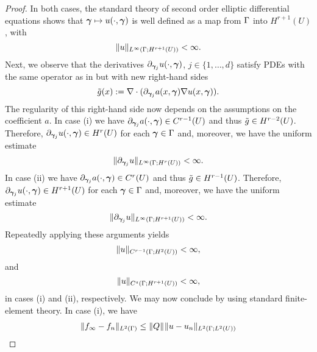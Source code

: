 \begin{proof}
	In both cases, the standard theory of second order elliptic differential equations shows that $\bm{\gamma}\mapsto u(\cdot,\bm{\gamma})$ is well defined as a map from $\Gamma$ into $H^{r+1}(U)$, with 
	\begin{equation*}
	\|u\|_{L^\infty(\Gamma;H^{r+1}(U))}<\infty.
	\end{equation*}
	Next, we observe that the derivatives $\partial_{\bm{\gamma}_{j}}u(\cdot,\bm{\gamma})$, $j\in \{1,\dots,d\}$ satisfy PDEs with the same operator as in  but with new right-hand sides
	\begin{equation*}
	\tilde{g}(x):=\nabla\cdot(\partial_{\bm{\gamma}_j}a(x,\bm{\gamma})\nabla u(x,\bm{\gamma})).
	\end{equation*}
	The regularity of this right-hand side now depends on the assumptions on the coefficient $a$.
	In case (i) we have $\partial_{\bm{\gamma}_j}a(\cdot,\bm{\gamma})\in C^{r-1}(U)$ and thus $\tilde{g}\in H^{r-2}(U)$. Therefore, $\partial_{\bm{\gamma}_{j}}u(\cdot,\bm{\gamma})\in H^{r}(U)$ for each $\bm{\gamma}\in\Gamma$ and, moreover, we have the uniform estimate
		\begin{equation*}
		\|\partial_{\bm{\gamma}_j}u\|_{L^\infty(\Gamma;H^{r}(U))}<\infty.
		\end{equation*}
		In case (ii) we have $\partial_{\bm{\gamma}_j}a(\cdot,\bm{\gamma})\in C^{r}(U)$ and thus $\tilde{g}\in H^{r-1}(U)$. Therefore, $\partial_{\bm{\gamma}_{j}}u(\cdot,\bm{\gamma})\in H^{r+1}(U)$ for each $\bm{\gamma}\in\Gamma$ and, moreover, we have the uniform estimate
		\begin{equation*}
		\|\partial_{\bm{\gamma}_j}u\|_{L^\infty(\Gamma;H^{r+1}(U))}<\infty.
		\end{equation*}
		Repeatedly applying these arguments yields
			\begin{equation*}
			\|u\|_{C^{r-1}(\Gamma;H^2(U))}<\infty,
			\end{equation*}
			and
			\begin{equation*}
			\|u\|_{C^{s}(\Gamma;H^{r+1}(U))}<\infty,
			\end{equation*}
		in cases (i) and (ii), respectively. We may now conclude by using standard finite-element theory. In case (i), we have
		\begin{equation*}
		\begin{split}
		\norm{\rs_{\infty}-\rs_{n}}{L^2(\domPS)}&\leq \norm{Q}{}\norm{\pde-\pde_{n}}{L^2(\domPS;L^2(U))}\\

\end{split}
\end{equation*}
\end{proof}
